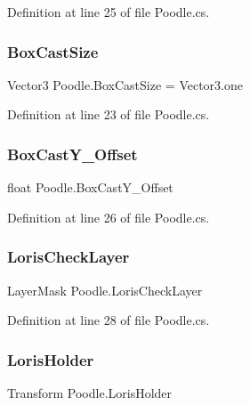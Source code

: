 Definition at line 25 of file Poodle.\+cs.

\mbox{\label{class_poodle_ab04d1e89fcda03d28adc20257e7eb91d}} 
\subsubsection{\texorpdfstring{Box\+Cast\+Size}{BoxCastSize}}
{\footnotesize\ttfamily Vector3 Poodle.\+Box\+Cast\+Size = Vector3.\+one}



Definition at line 23 of file Poodle.\+cs.

\mbox{\label{class_poodle_a8f3004f4bdff69af0fac2ee8bd0646cd}} 
\subsubsection{\texorpdfstring{Box\+Cast\+Y\+\_\+\+Offset}{BoxCastY\_Offset}}
{\footnotesize\ttfamily float Poodle.\+Box\+Cast\+Y\+\_\+\+Offset}



Definition at line 26 of file Poodle.\+cs.

\mbox{\label{class_poodle_a3b1ec14dd7f47087bc37e16fadd568a4}} 
\subsubsection{\texorpdfstring{Loris\+Check\+Layer}{LorisCheckLayer}}
{\footnotesize\ttfamily Layer\+Mask Poodle.\+Loris\+Check\+Layer}



Definition at line 28 of file Poodle.\+cs.

\mbox{\label{class_poodle_a75a53eff0fa4c18603e09edf63ffbbf6}} 
\subsubsection{\texorpdfstring{Loris\+Holder}{LorisHolder}}
{\footnotesize\ttfamily Transform Poodle.\+Loris\+Holder}




